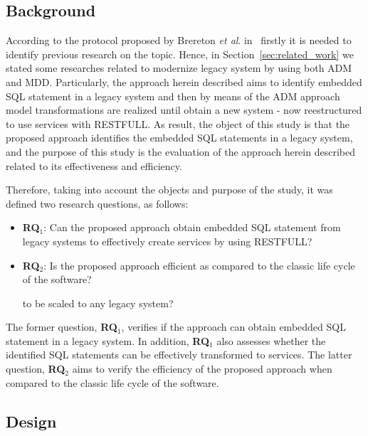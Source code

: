 \documentclass[a4paper,twoside]{article}
\begin{document}
\subsection{Background} %
\label{sub:background_case_study}

According to the protocol proposed by Brereton \textit{et al}. in~\cite{case-study-template-2008} firstly it is needed to identify previous research on the topic. Hence, in Section~\ref{sec:related_work} we stated some researches related to modernize legacy system by using both ADM and MDD. Particularly, the approach herein described aims to identify embedded SQL statement in a legacy system and then by means of the ADM approach model transformations are realized until obtain a new system - now reestructured to use services with RESTFULL. As result, the object of this study is that the proposed approach identifies the embedded SQL statements in a legacy system, and the purpose of this study is the evaluation of the approach herein described related to its effectiveness and efficiency.

Therefore, taking into account the objects and purpose of the study, it was defined two research questions, as follows: 

\begin{itemize}
	\item \textbf{RQ$_1$}: Can the proposed approach obtain embedded SQL statement from legacy systems to effectively create services by using RESTFULL?
	\item \textbf{RQ$_2$}: Is the proposed approach efficient as compared to the classic life cycle of the software? 

	to be scaled to any legacy system?
\end{itemize}

The former question, \textbf{RQ$_1$}, verifies if the approach can obtain embedded SQL statement in a legacy system. In addition, \textbf{RQ$_1$} also assesses whether the identified SQL statements can be effectively transformed to services. The latter question, \textbf{RQ$_2$} aims to verify the efficiency of the proposed approach when compared to the classic life cycle of the software.

\subsection{Design} %
\label{sub:design_case_study}
\end{document}
